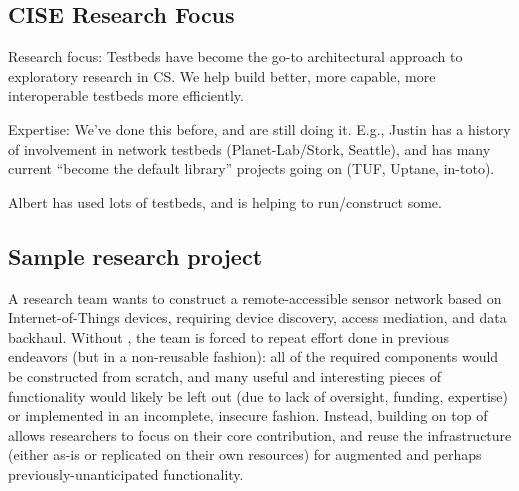 

\subsection{CISE Research Focus}

Research focus: Testbeds have become the go-to architectural approach
to exploratory research in CS. We help build better, more capable,
more interoperable testbeds more efficiently.

Expertise: We've done this before, and are still doing it.
E.g., Justin has a history of involvement in network testbeds
(Planet-Lab/Stork, Seattle), and has many current ``become the default
library'' projects going on (TUF, Uptane, in-toto).

Albert has used lots of testbeds, and is helping to run/construct some.

\subsection{Sample research project}
A research team wants to construct a remote-accessible sensor network
based on Internet-of-Things devices, requiring device discovery, access
mediation, and data backhaul.
Without \sysname, the team is forced to repeat effort done in previous
endeavors (but in a non-reusable fashion): all of the required
components would be constructed
from scratch, and many useful and interesting pieces of functionality
would likely be left out (due to lack of oversight, funding, expertise)
or implemented in an incomplete, insecure fashion.
Instead, building on top of \sysname allows researchers to focus on their
core contribution, and reuse the \sysname infrastructure (either as-is or
replicated on their own resources) for augmented and perhaps
previously-unanticipated functionality.

